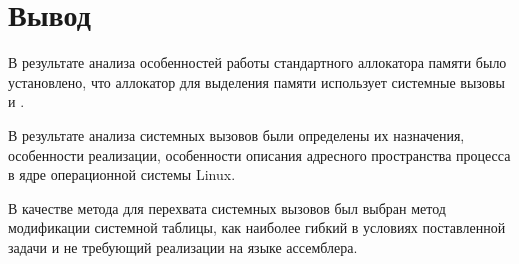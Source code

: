 \section{Вывод}

В результате анализа особенностей работы стандартного аллокатора памяти было установлено, что аллокатор для выделения памяти использует системные вызовы  и .

В результате анализа системных вызовов были определены их назначения, особенности реализации, особенности описания адресного пространства процесса в ядре операционной системы Linux.

В качестве метода для перехвата системных вызовов был выбран метод модификации системной таблицы, как наиболее гибкий в условиях поставленной задачи и не требующий реализации на языке ассемблера.

